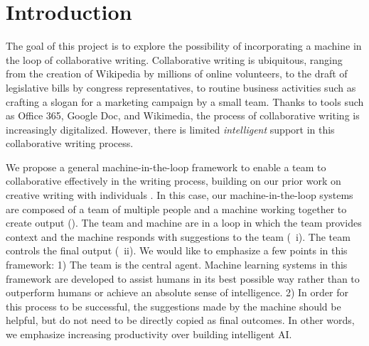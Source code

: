 
\section{Introduction}

The goal of this project is to explore the possibility of incorporating a machine in the loop of collaborative writing.
Collaborative writing is ubiquitous, ranging from the creation of Wikipedia by millions of online volunteers, to the draft of legislative bills by congress representatives, to routine business activities such as crafting a slogan for a marketing campaign by a small team.
Thanks to tools such as Office 365, Google Doc, and Wikimedia, the process of collaborative writing is increasingly digitalized.
However, there is limited {\em intelligent} support in this collaborative writing process.


We propose a general machine-in-the-loop framework to enable a team to collaborative effectively in the writing process, building on our prior work on creative writing with individuals \citep{clark+etal18}.
In this case, our machine-in-the-loop systems are composed of a team of multiple people and a machine working together to create output (). The team and machine are in a loop in which the team provides context and the machine responds with suggestions to the team (~i). The team controls the final output (~ii).
We would like to emphasize a few points in this framework:
1)  The team is the central agent. Machine learning systems in this framework are developed to assist humans in its best possible way rather than to outperform humans or achieve an absolute sense of intelligence.
2)  In order for this process to be successful, the suggestions made by the machine should be helpful, but do not need to be directly copied as final outcomes.
In other words, we emphasize increasing productivity over building intelligent AI.



